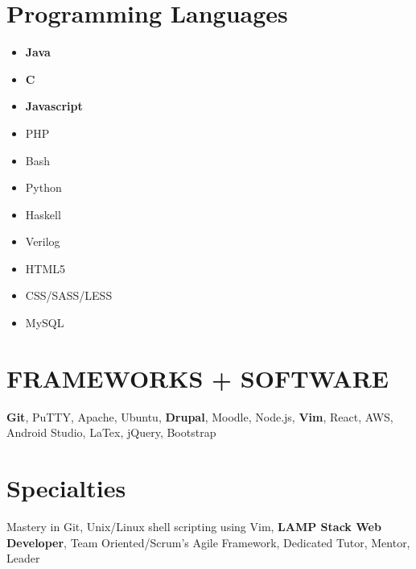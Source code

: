 \documentclass{tccv}
\begin{document}
\begin{multicols}{2}
\section{Programming Languages}

\begin{itemize}[wide=0pt, itemsep=-5pt]
	\item[] \textbf{Java}
	\item[] \textbf{C}
	\item[] \textbf{Javascript}
	\item[] PHP
	\item[] Bash
	\item[] Python
	\item[] Haskell
	\item[] Verilog
	\item[] HTML5
	\item[] CSS/SASS/LESS
	\item[] MySQL
\end{itemize}

\section{FRAMEWORKS + SOFTWARE}
\textbf{Git}, PuTTY, Apache, Ubuntu, \textbf{Drupal}, Moodle, Node.js, \textbf{Vim}, React, AWS, Android Studio, LaTex, jQuery, Bootstrap

\section{Specialties}
Mastery in Git, Unix/Linux shell scripting using Vim, \textbf{LAMP Stack Web Developer}, Team Oriented/Scrum's Agile Framework, Dedicated Tutor, Mentor, Leader
\end{multicols}
\end{document}
